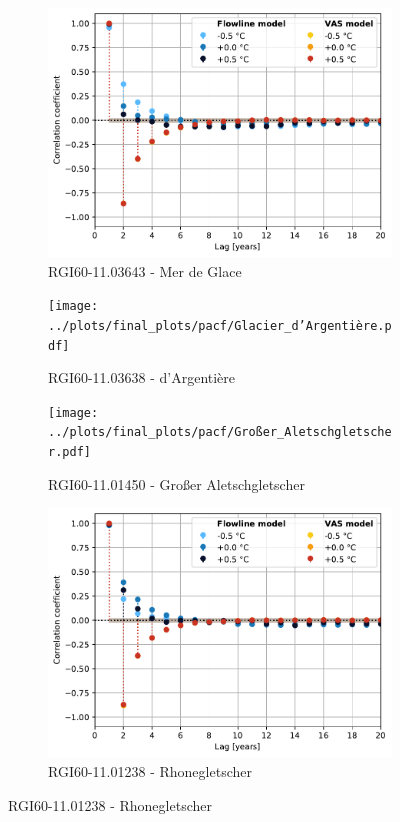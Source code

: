 \begin{figure}[htp]
        \begin{subfigure}[b]{0.48\textwidth}
          \caption{RGI60-11.03643 - Mer de Glace}
          \label{fig:pacf:mer_de_glace}
          \centering
          \includegraphics[width=\textwidth]{../plots/final_plots/pacf/Mer_de_Glace.pdf}
        \end{subfigure}
        \hfill
        \begin{subfigure}[b]{0.48\textwidth}
          \caption{RGI60-11.03638 - d'Argentière}
          \label{fig:pacf:glacier_d_argentiere}
          \centering
          \texttt{[image: ../plots/final\_plots/pacf/Glacier\_d'Argentière.pdf]}
        \end{subfigure}

        \begin{subfigure}[b]{0.48\textwidth}
          \caption{RGI60-11.01450 - Großer Aletschgletscher}
          \label{fig:pacf:großer_aletschgletscher}
          \centering
          \texttt{[image: ../plots/final\_plots/pacf/Großer\_Aletschgletscher.pdf]}
        \end{subfigure}
        \hfill
        \begin{subfigure}[b]{0.48\textwidth}
          \caption{RGI60-11.01238 - Rhonegletscher}
          \label{fig:pacf:rhonegletscher}
          \centering
          \includegraphics[width=\textwidth]{../plots/final_plots/pacf/Rhonegletscher.pdf}
        \end{subfigure}


\end{figure}
